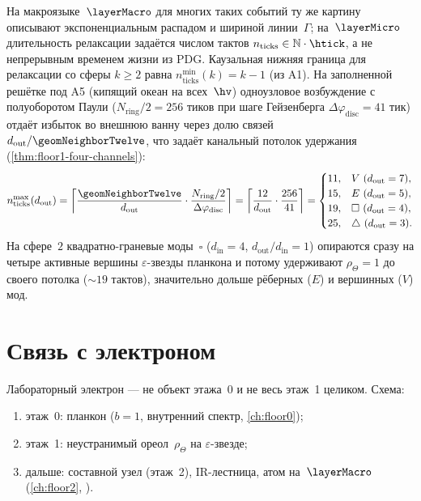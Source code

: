 На макроязыке~$\layerMacro$ для многих таких событий ту же картину описывают
экспоненциальным распадом и шириной линии~$\Gamma$;
на~$\layerMicro$ длительность релаксации задаётся числом тактов
$n_{\mathrm{ticks}}\in\mathbb{N}\cdot\htick$, а не непрерывным временем жизни из PDG.
Каузальная нижняя граница для релаксации со сферы $k\ge 2$ равна $n_{\mathrm{ticks}}^{\min}(k)=k-1$ (из A1).
На заполненной решётке под A5 (кипящий океан на всех~$\hv$) одноузловое возбуждение с полуоборотом Паули
($N_{\mathrm{ring}}/2=256$ тиков при шаге Гейзенберга $\Delta\varphi_{\mathrm{disc}}=41$ тик)
отдаёт избыток во внешнюю ванну через долю связей $d_{\mathrm{out}}/\geomNeighborTwelve$,
что задаёт канальный потолок удержания (\cref{thm:floor1-four-channels}):
\begin{equation}
\label{eq:floor1-channel-ceiling}
  n_{\mathrm{ticks}}^{\max}(d_{\mathrm{out}})
  = \left\lceil\frac{\geomNeighborTwelve}{d_{\mathrm{out}}}\cdot\frac{N_{\mathrm{ring}}/2}{\Delta\varphi_{\mathrm{disc}}}\right\rceil
  = \left\lceil\frac{12}{d_{\mathrm{out}}}\cdot\frac{256}{41}\right\rceil
  =
  \begin{cases}
    11, & V\ (d_{\mathrm{out}}=7),\\
    15, & E\ (d_{\mathrm{out}}=5),\\
    19, & \square\ (d_{\mathrm{out}}=4),\\
    25, & \triangle\ (d_{\mathrm{out}}=3).
  \end{cases}
\end{equation}
На сфере~$2$ квадратно-граневые моды~$\square$ ($d_{\mathrm{in}}=4$, $d_{\mathrm{out}}/d_{\mathrm{in}}=1$)
опираются сразу на четыре активные вершины $\varepsilon$-звезды планкона и потому удерживают $\rho_\Theta=1$
до своего потолка ($\sim 19$ тактов), значительно дольше рёберных ($E$) и вершинных ($V$) мод.

\section{Связь с электроном}
\label{sec:floor1-electron-bridge}

Лабораторный электрон --- не объект этажа~0 и не весь этаж~1 целиком.
Схема:
\begin{enumerate}[noitemsep]
\item этаж~0: планкон ($b=1$, внутренний спектр, \cref{ch:floor0});
\item этаж~1: неустранимый ореол~$\rho_\Theta$ на $\varepsilon$-звезде;
\item дальше: составной узел (этаж~2), IR-лестница, атом на~$\layerMacro$
  (\cref{ch:floor2}, ).
\end{enumerate}

